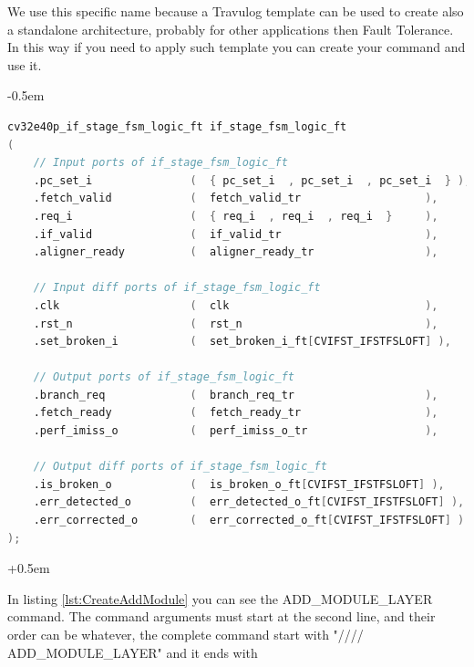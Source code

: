 {{{            We use this specific name because a Travulog template can be used to create also a standalone architecture, probably for other applications then Fault Tolerance. In this way if you need to apply such template you can create your command and use it.
            
            
    		\openup -0.5em
         
    		    \begin{lstlisting}[basicstyle=\ttfamily\scriptsize, language=Verilog, caption=SV result code after the conversion from HTV code of if stage fsm logic module created using CREATE MODULE command, label=lst:CreateAddModuleSV]
cv32e40p_if_stage_fsm_logic_ft if_stage_fsm_logic_ft
(
    // Input ports of if_stage_fsm_logic_ft
    .pc_set_i               (  { pc_set_i  , pc_set_i  , pc_set_i  } ),
    .fetch_valid            (  fetch_valid_tr                   ),
    .req_i                  (  { req_i  , req_i  , req_i  }     ),
    .if_valid               (  if_valid_tr                      ),
    .aligner_ready          (  aligner_ready_tr                 ),

    // Input diff ports of if_stage_fsm_logic_ft
    .clk                    (  clk                              ),
    .rst_n                  (  rst_n                            ),
    .set_broken_i           (  set_broken_i_ft[CVIFST_IFSTFSLOFT] ),

    // Output ports of if_stage_fsm_logic_ft
    .branch_req             (  branch_req_tr                    ),
    .fetch_ready            (  fetch_ready_tr                   ),
    .perf_imiss_o           (  perf_imiss_o_tr                  ),

    // Output diff ports of if_stage_fsm_logic_ft
    .is_broken_o            (  is_broken_o_ft[CVIFST_IFSTFSLOFT] ),
    .err_detected_o         (  err_detected_o_ft[CVIFST_IFSTFSLOFT] ),
    .err_corrected_o        (  err_corrected_o_ft[CVIFST_IFSTFSLOFT] )
);
       			\end{lstlisting}
    		
    		\openup +0.5em
           
           In listing \ref{lst:CreateAddModule} you can see the ADD\_MODULE\_LAYER command.
           The command arguments must start at the second line, and their order can be whatever, the complete command start with "//// ADD\_MODULE\_LAYER" and it ends with 
           
}}}
